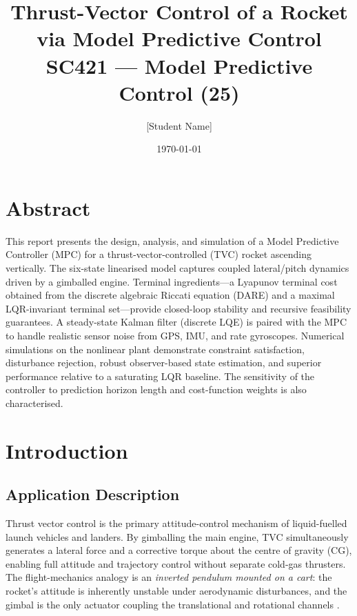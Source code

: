 \documentclass[11pt,a4paper]{article}
\title{\textbf{Thrust-Vector Control of a Rocket via Model Predictive Control}\\
       \large SC421 — Model Predictive Control (25)}
\author{[Student Name]}
\date{\today}
\begin{document}
\maketitle
\vspace{-4mm}

\section*{Abstract}
This report presents the design, analysis, and simulation of a Model Predictive
Controller (MPC) for a thrust-vector-controlled (TVC) rocket ascending vertically.
The six-state linearised model captures coupled lateral/pitch dynamics driven by
a gimballed engine.  Terminal ingredients---a Lyapunov terminal cost obtained from
the discrete algebraic Riccati equation (DARE) and a maximal LQR-invariant terminal
set---provide closed-loop stability and recursive feasibility guarantees.
A steady-state Kalman filter (discrete LQE) is paired with the MPC to handle
realistic sensor noise from GPS, IMU, and rate gyroscopes.
Numerical simulations on the nonlinear plant demonstrate constraint satisfaction,
disturbance rejection, robust observer-based state estimation, and superior
performance relative to a saturating LQR baseline.  The sensitivity of the
controller to prediction horizon length and cost-function weights is also
characterised.

\section{Introduction}

\subsection{Application Description}

Thrust vector control is the primary attitude-control mechanism of liquid-fuelled
launch vehicles and landers.  By gimballing the main engine, TVC simultaneously
generates a lateral force and a corrective torque about the centre of gravity (CG),
enabling full attitude and trajectory control without separate cold-gas thrusters.
The flight-mechanics analogy is an \emph{inverted pendulum mounted on a cart}: the
rocket's attitude is inherently unstable under aerodynamic disturbances, and the
gimbal is the only actuator coupling the translational and rotational channels
\cite{Wie1998, Greensite1970}.
\end{document}
